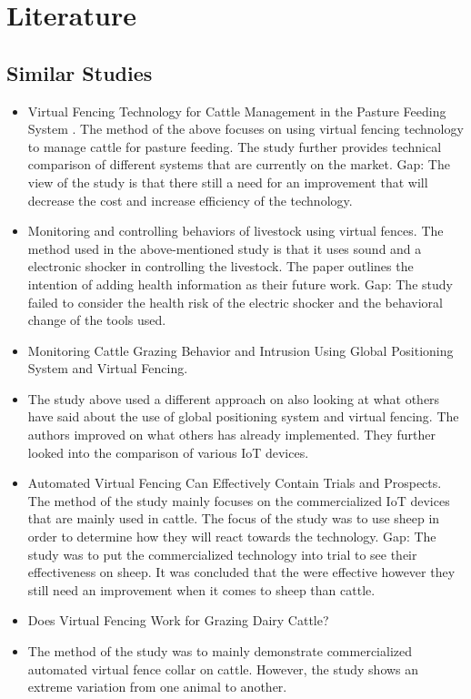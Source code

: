 \documentclass[conference]{main}
\begin{document}
\section{Literature}

\subsection{Similar Studies}

\begin{itemize}

\item   Virtual Fencing Technology for Cattle Management in the Pasture Feeding
    System \cite{b5}.
        The method of the above focuses on using virtual fencing technology to
        manage cattle for pasture feeding. The study further provides technical
        comparison of different systems that are currently on the market.
        Gap: The view of the study is that there still a need for an
        improvement that will decrease the cost and increase efficiency of the
        technology.

\item   Monitoring and controlling behaviors of livestock using virtual
    fences\cite{b6}.
    The method used in the above-mentioned study is that it uses sound and a
        electronic shocker in controlling the livestock. The paper outlines the
        intention of adding health information as their future work.
    Gap: The study failed to consider the health risk of the electric shocker and the behavioral change of the tools used.

\item   Monitoring Cattle Grazing Behavior and Intrusion Using Global
    Positioning System and Virtual Fencing\cite{b7}.

\item The study above used a different approach on also looking at what others have said about the use of global positioning system and virtual fencing. The authors improved on what others has already implemented. They further looked into the comparison of various IoT devices.

\item    Automated Virtual Fencing Can Effectively Contain Trials and Prospects\cite{b8}.
    The method of the study mainly focuses on the commercialized IoT devices
        that are mainly used in cattle. The focus of the study was to use sheep
        in order to determine how they will react towards the technology.
    Gap: The study was to put the commercialized technology into trial to see their effectiveness on sheep. It was concluded that the were effective however they still need an improvement when it comes to sheep than cattle.

\item Does Virtual Fencing Work for Grazing Dairy Cattle\cite{b9}?
\item The method of the study was to mainly demonstrate commercialized automated virtual fence collar on cattle. However, the study shows an extreme variation from one animal to another.

\end{itemize}
\end{document}
